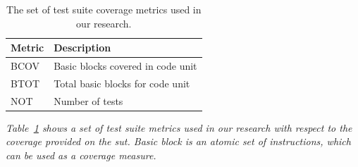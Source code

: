 \begin{table}[h]
  \centering
  \begin{tabular}{|l|l|}
    \hline
    \rowcolor[RGB]{169,196,223}
    \textbf{Metric} & \textbf{Description} \\
    \hline BCOV & Basic blocks covered in code unit \\
    \hline BTOT & Total basic blocks for code unit \\
    \hline NOT & Number of tests \\
    \hline
  \end{tabular}
  \caption{The set of test suite coverage metrics used in our research.}
  \vspace{1mm}
  \footnotesize{\emph{Table~\ref{tab:test_suite_coverage_metrics} shows a set of test suite metrics used in our research with respect to the coverage provided on the \gls{sut}. \emph{Basic block} is an atomic set of instructions, which can be used as a coverage measure.}}
  \vspace{1mm}
  \label{tab:test_suite_coverage_metrics}
\end{table}
